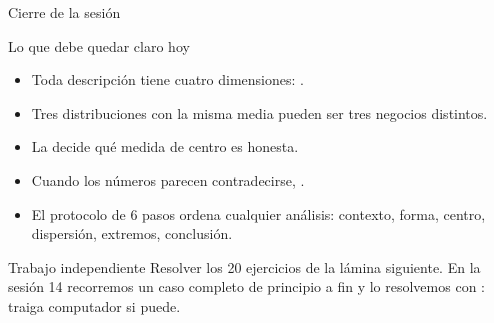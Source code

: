 \documentclass[aspectratio=169,10pt]{beamer}
\begin{document}
\begin{frame}{Cierre de la sesión}
  \begin{block}{Lo que debe quedar claro hoy}
    \scriptsize
    \begin{itemize}\setlength{\itemsep}{0.02cm}
      \item Toda descripción tiene cuatro dimensiones: .
      \item Tres distribuciones con la misma media pueden ser tres negocios
            distintos.
      \item La  decide qué medida de centro es honesta.
      \item Cuando los números parecen contradecirse, .
      \item El protocolo de 6 pasos ordena cualquier análisis: contexto, forma,
            centro, dispersión, extremos, conclusión.
    \end{itemize}
  \end{block}

  \vspace{0.1cm}
  \begin{alertblock}{Trabajo independiente}
    \scriptsize
    Resolver los 20 ejercicios de la lámina siguiente. En la sesión 14
    recorremos un caso completo de principio a fin y lo resolvemos con
    : traiga computador si puede.
  \end{alertblock}
\end{frame}
\end{document}

